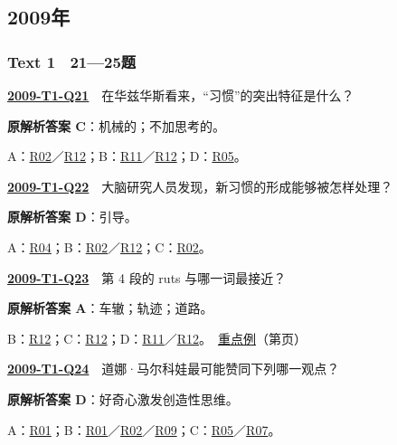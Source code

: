 \documentclass[11pt,a4paper]{article}
\begin{document}
\subsection{2009年}\label{year-2009}
\subsubsection{Text 1　21—25题}
\label{idx-2009-T1-Q21}\noindent\textbf{\href{https://zj139.github.io/math-notes/english/67d0fd0739843c9aede29847/\#q21}{2009-T1-Q21}}　在华兹华斯看来，“习惯”的突出特征是什么？\par\nopagebreak
\noindent\textbf{原解析答案 C}：机械的；不加思考的。\par\nopagebreak
\noindent A：\hyperref[cat-R02]{R02}／\hyperref[cat-R12]{R12}；B：\hyperref[cat-R11]{R11}／\hyperref[cat-R12]{R12}；D：\hyperref[cat-R05]{R05}。\par\smallskip
{}\label{idx-2009-T1-Q22}\noindent\textbf{\href{https://zj139.github.io/math-notes/english/67d0fd0739843c9aede29847/\#q22}{2009-T1-Q22}}　大脑研究人员发现，新习惯的形成能够被怎样处理？\par\nopagebreak
\noindent\textbf{原解析答案 D}：引导。\par\nopagebreak
\noindent A：\hyperref[cat-R04]{R04}；B：\hyperref[cat-R02]{R02}／\hyperref[cat-R12]{R12}；C：\hyperref[cat-R02]{R02}。\par\smallskip
{}\label{idx-2009-T1-Q23}\noindent\textbf{\href{https://zj139.github.io/math-notes/english/67d0fd0739843c9aede29847/\#q23}{2009-T1-Q23}}　第 4 段的 ruts 与哪一词最接近？\par\nopagebreak
\noindent\textbf{原解析答案 A}：车辙；轨迹；道路。\par\nopagebreak
\noindent B：\hyperref[cat-R12]{R12}；C：\hyperref[cat-R12]{R12}；D：\hyperref[cat-R11]{R11}／\hyperref[cat-R12]{R12}。　\hyperref[case-2009-T1-Q23]{重点例}（第\pageref{case-2009-T1-Q23}页）\par\smallskip
{}\label{idx-2009-T1-Q24}\noindent\textbf{\href{https://zj139.github.io/math-notes/english/67d0fd0739843c9aede29847/\#q24}{2009-T1-Q24}}　道娜·马尔科娃最可能赞同下列哪一观点？\par\nopagebreak
\noindent\textbf{原解析答案 D}：好奇心激发创造性思维。\par\nopagebreak
\noindent A：\hyperref[cat-R01]{R01}；B：\hyperref[cat-R01]{R01}／\hyperref[cat-R02]{R02}／\hyperref[cat-R09]{R09}；C：\hyperref[cat-R05]{R05}／\hyperref[cat-R07]{R07}。\par\smallskip
\end{document}
